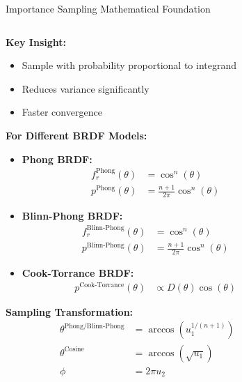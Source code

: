 \documentclass[aspectratio=169]{beamer}
\begin{document}
\begin{frame}{Importance Sampling Mathematical Foundation}
    \begin{columns}
        \begin{column}{0.6\textwidth}
            \textbf{Key Insight:}
            \begin{itemize}
                \item<1-> Sample with probability proportional to integrand
                \item<2-> Reduces variance significantly
                \item<3-> Faster convergence
            \end{itemize}
            
            \vspace{0.5cm}
            \textbf{For Different BRDF Models:}
            \begin{itemize}
                \item<1-> \textbf{Phong BRDF:}
                \begin{align}
                    f_r^{\text{Phong}}(\theta) &= \cos^n(\theta) \\
                    p^{\text{Phong}}(\theta) &= \frac{n+1}{2\pi} \cos^n(\theta)
                \end{align}
                \item<2-> \textbf{Blinn-Phong BRDF:}
                \begin{align}
                    f_r^{\text{Blinn-Phong}}(\theta) &= \cos^n(\theta) \\
                    p^{\text{Blinn-Phong}}(\theta) &= \frac{n+1}{2\pi} \cos^n(\theta)
                \end{align}
                \item<3-> \textbf{Cook-Torrance BRDF:}
                \begin{align}
                    p^{\text{Cook-Torrance}}(\theta) &\propto D(\theta) \cos(\theta)
                \end{align}
            \end{itemize}
            
            \textbf{Sampling Transformation:}
            \begin{align}
                \theta^{\text{Phong/Blinn-Phong}} &= \arccos(u_1^{1/(n+1)}) \\
                \theta^{\text{Cosine}} &= \arccos(\sqrt{u_1}) \\
                \phi &= 2\pi u_2
            \end{align}
        \end{column}
        \begin{column}{0.4\textwidth}
\end{column}
\end{columns}
\end{frame}
\end{document}
